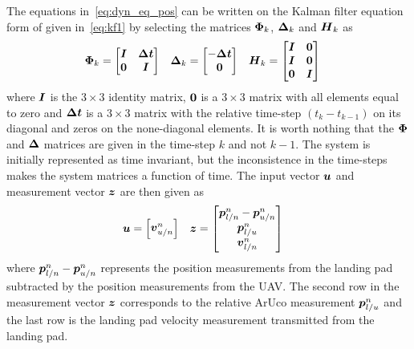 The equations in~\ref{eq:dyn_eq_pos} can be written on the Kalman filter equation form of given in~\ref{eq:kf1} by selecting the matrices $\boldsymbol{\Phi}_k$, $\boldsymbol{\Delta}_k$ and $\boldsymbol{H}_k$ as
\begin{align}\label{eq:mat_pos}
    \boldsymbol{\Phi}_k&=
    \begin{bmatrix}
        \boldsymbol{I} & \boldsymbol{\Delta t}\\
        \boldsymbol{0} & \boldsymbol{I}
    \end{bmatrix}
    &
    \boldsymbol{\Delta}_k&=
    \begin{bmatrix}
        -\boldsymbol{\Delta t}\\
        \boldsymbol{0}
    \end{bmatrix}
    &
    \boldsymbol{H}_k&=
    \begin{bmatrix}
        \boldsymbol{I} & \boldsymbol{0}\\
        \boldsymbol{I} & \boldsymbol{0}\\
        \boldsymbol{0} & \boldsymbol{I}
    \end{bmatrix}
\end{align}
where $\boldsymbol{I}$ is the $3\times3$ identity matrix, $\boldsymbol{0}$ is a $3\times3$ matrix with all elements equal to zero and $\boldsymbol{\Delta t}$ is a $3\times3$ matrix with the relative time-step $(t_{k}-t_{k-1})$ on its diagonal and zeros on the none-diagonal elements. It is worth nothing that the $\boldsymbol{\Phi}$ and $\boldsymbol{\Delta}$ matrices are given in the time-step $k$ and not $k-1$. The system is initially represented as time invariant, but the inconsistence in the time-steps makes the system matrices a function of time. The input vector $\boldsymbol{u}$ and measurement vector $\boldsymbol{z}$ are then given as
\begin{align}
    \boldsymbol{u}&=
    \begin{bmatrix}
        \boldsymbol{v}^n_{u/n}    
    \end{bmatrix}
    &
    \boldsymbol{z}&=
    \begin{bmatrix}
        \boldsymbol{p}^n_{l/n}-\boldsymbol{p}^n_{u/n}\\
        \boldsymbol{p}^n_{l/u}\\
        \boldsymbol{v}^n_{l/n}
    \end{bmatrix}
\end{align}
where $\boldsymbol{p}^n_{l/n}-\boldsymbol{p}^n_{u/n}$ represents the position measurements from the landing pad subtracted by the position measurements from the \gls{UAV}. The second row in the measurement vector $\boldsymbol{z}$ corresponds to the relative ArUco measurement $\boldsymbol{p}^n_{l/u}$ and the last row is the landing pad velocity measurement transmitted from the landing pad.

